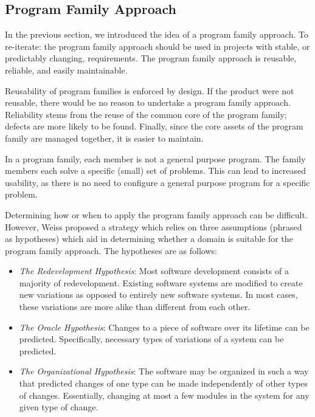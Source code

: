 \documentclass[10pt, preprint]{sigplanconf}
\begin{document}
\subsection{Program Family Approach}
\label{subsec:program}

In the previous section, we introduced the idea of a program family approach. To re-iterate: the program family approach should be used in projects with stable, or predictably changing, requirements. The program family approach is reusable, reliable, and easily maintainable.

Reusability of program families is enforced by design. If the product were not reusable, there would be no reason to undertake a program family approach. Reliability stems from the reuse of the common core of the program family; defects are more likely to be found. Finally, since the core assets of the program family are managed together, it is easier to maintain. 

In a program family, each member is not a general purpose program. The family members each solve a specific (small) set of problems. This can lead to increased usability, as there is no need to configure a general purpose program for a specific problem.

Determining how or when to apply the program family approach can be difficult. However, Weiss \cite{Weiss} proposed a strategy which relies on three assumptions (phrased as hypotheses) which aid in determining whether a domain is suitable for the program family approach. The hypotheses are as follows:

\begin{itemize}
	\item \textit{The Redevelopment Hypothesis}: Most software development consists of a majority of redevelopment. Existing software systems are modified to create new variations as opposed to entirely new software systems. In most cases, these variations are more alike than different from each other.
	\item \textit{The Oracle Hypothesis}: Changes to a piece of software over its lifetime can be predicted. Specifically, necessary types of variations of a system can be predicted.
	\item \textit{The Organizational Hypothesis}: The software may be organized in such a way that predicted changes of one type can be made independently of other types of changes. Essentially, changing at most a few modules in the system for any given type of change.
\end{itemize}
\end{document}
